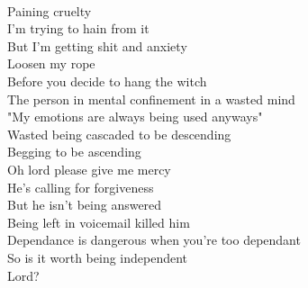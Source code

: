 \documentclass[12pt, b5paper, oneside]{book}
\begin{document}
\\Paining cruelty
\\I'm trying to hain from it
\\But I'm getting shit and anxiety
\\Loosen my rope
\\Before you decide to hang the witch
\\The person in mental confinement in a wasted mind
\\"My emotions are always being used anyways"
\\Wasted being cascaded to be descending
\\Begging to be ascending
\\Oh lord please give me mercy
\\He's calling for forgiveness
\\But he isn't being answered
\\Being left in voicemail killed him 
\\Dependance is dangerous when you're too dependant
\\So is it worth being independent
\\Lord?
\newpage
\end{document}

